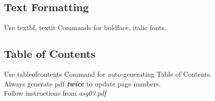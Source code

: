 \documentclass{article}
\begin{document}
\subsection{Text Formatting}
Use textbf, textit Commands for boldface, italic fonts.

\subsection{Table of Contents}
Use tableofcontents Command for auto-generating Table of Contents.\\
Always generate pdf \textbf{\textit{twice}} to update page numbers.\\
Follow instructions from \textit{asg03.pdf}

%
%
\end{document}
